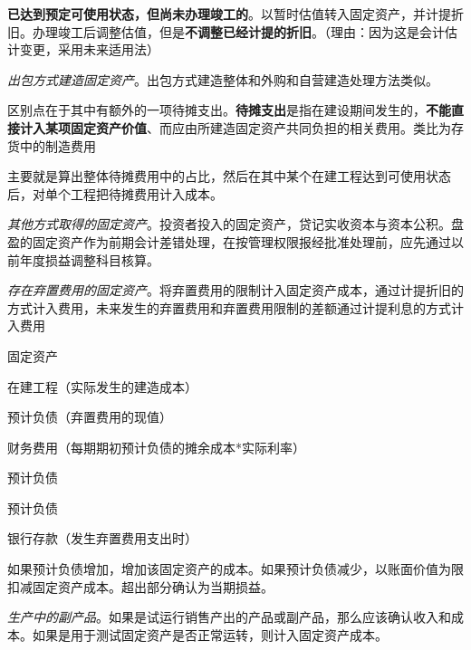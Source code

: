 \documentclass[UTF8,12pt]{ctexart}
\newenvironment{Dr}{%
	\begin{list}{}%
		{
			\setlength{\leftmargin}{2em}
			\setlength{\labelwidth}{2em}
			\setlength{\labelsep}{0pt}
			\setlength{\itemindent}{0pt}
			\setlength{\listparindent}{0pt}
			\setlength{\parsep}{0pt}
			\setlength{\topsep}{0pt}
		}
		\item[\textbf{借：}]
	}{%
	\end{list}
}
\newenvironment{Cr}{%
	\begin{list}{}%
		{
			\setlength{\leftmargin}{2em}
			\setlength{\labelwidth}{2em}
			\setlength{\labelsep}{0pt}
			\setlength{\itemindent}{0pt}
			\setlength{\listparindent}{0pt}
			\setlength{\parsep}{0pt}
			\setlength{\topsep}{0pt}
		}
		\item[\textbf{贷：}]
	}{%
	\end{list}
}
\numberwithin{equation}{section} %
\numberwithin{figure}{section}
\numberwithin{table}{section}
\begin{document}
\begin{enumerate}
		
		\textbf{已达到预定可使用状态，但尚未办理竣工的}。以暂时估值转入固定资产，并计提折旧。办理竣工后调整估值，但是\textbf{不调整已经计提的折旧}。（理由：因为这是会计估计变更，采用未来适用法）
		
		\item \textit{出包方式建造固定资产}。出包方式建造整体和外购和自营建造处理方法类似。
		
		区别点在于其中有额外的一项待摊支出。\textbf{待摊支出}是指在建设期间发生的，\textbf{不能直接计入某项固定资产价值}、而应由所建造固定资产共同负担的相关费用。类比为存货中的制造费用
		
		主要就是算出整体待摊费用中的占比，然后在其中某个在建工程达到可使用状态后，对单个工程把待摊费用计入成本。
		
		
		\item \textit{其他方式取得的固定资产}。投资者投入的固定资产，贷记实收资本与资本公积。盘盈的固定资产作为前期会计差错处理，在按管理权限报经批准处理前，应先通过以前年度损益调整科目核算。
		
		\item \textit{存在弃置费用的固定资产}。将弃置费用的限制计入固定资产成本，通过计提折旧的方式计入费用，未来发生的弃置费用和弃置费用限制的差额通过计提利息的方式计入费用
		
		\begin{Dr}
			固定资产
		\end{Dr}
		\begin{Cr}
			在建工程（实际发生的建造成本）
			
			预计负债（弃置费用的现值）
		\end{Cr}
		
		\begin{Dr}
			财务费用（每期期初预计负债的摊余成本*实际利率）
		\end{Dr}
		\begin{Cr}
			预计负债
		\end{Cr}
		
		\begin{Dr}
			预计负债
		\end{Dr}
		\begin{Cr}
			银行存款（发生弃置费用支出时）
		\end{Cr}
		
		如果预计负债增加，增加该固定资产的成本。如果预计负债减少，以账面价值为限扣减固定资产成本。超出部分确认为当期损益。
		
		\item \textit{生产中的副产品}。如果是试运行销售产出的产品或副产品，那么应该确认收入和成本。如果是用于测试固定资产是否正常运转，则计入固定资产成本。
		
	\end{enumerate}
	
\end{document}
